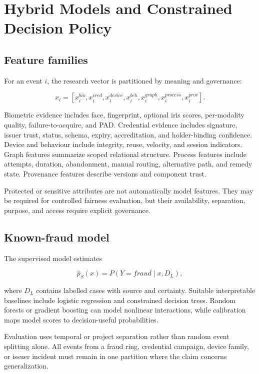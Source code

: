 \chapter{Hybrid Models and Constrained Decision Policy}

\section{Feature families}

For an event $i$, the research vector is partitioned by meaning and governance:

\begin{equation}
x_i=[x_i^{bio},x_i^{cred},x_i^{device},x_i^{beh},x_i^{graph},x_i^{process},x_i^{prov}].
\end{equation}

Biometric evidence includes face, fingerprint, optional iris scores, per-modality quality, failure-to-acquire, and PAD. Credential evidence includes signature, issuer trust, status, schema, expiry, accreditation, and holder-binding confidence. Device and behaviour include integrity, reuse, velocity, and session indicators. Graph features summarize scoped relational structure. Process features include attempts, duration, abandonment, manual routing, alternative path, and remedy state. Provenance features describe versions and component trust.

Protected or sensitive attributes are not automatically model features. They may be required for controlled fairness evaluation, but their availability, separation, purpose, and access require explicit governance.

\section{Known-fraud model}

The supervised model estimates

\begin{equation}
\hat{p}_S(x)=P(Y=fraud\mid x,D_L),
\end{equation}

where $D_L$ contains labelled cases with source and certainty. Suitable interpretable baselines include logistic regression and constrained decision trees. Random forests or gradient boosting can model nonlinear interactions, while calibration maps model scores to decision-useful probabilities.

Evaluation uses temporal or project separation rather than random event splitting alone. All events from a fraud ring, credential campaign, device family, or issuer incident must remain in one partition where the claim concerns generalization.

